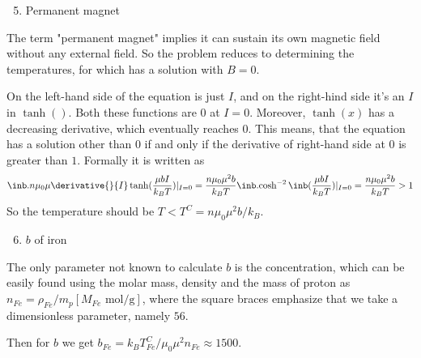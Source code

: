 \begin{enumerate}
\begin{enumerate}
    \setcounter{enumii}{4}
    \item Permanent magnet
\end{enumerate}

\hspace{.5cm}
The term "permanent magnet" implies
it can sustain its own magnetic field without any external field.
So the problem reduces to determining the temperatures,
for which  has a solution with $B = 0$.

\hspace{.5cm}
On the left-hand side of the equation is just $I$,
and on the right-hind side it's an $I$ in $\tanh()$.
Both these functions are $0$ at $I=0$.
Moreover, $\tanh(x)$ has a decreasing derivative,
which eventually reaches $0$.
This means, that the equation has a solution other than $0$
if and only if the derivative of right-hand side at $0$ is greater than $1$.
Formally it is written as
\begin{equation}
    \inb.{n \mu_0 \mu \derivative{}{I} \tanh(\frac{\mu bI}{k_B T})}|_{I=0} =
    \frac{n \mu_0 \mu^2 b}{k_B T} \inb.{\cosh^{-2} \inb({\frac{\mu bI}{k_B T}})}|_{I=0} =
    \frac{n \mu_0 \mu^2 b}{k_B T} > 1
\end{equation}
So the temperature should be $T < T^C = n \mu_0 \mu^2 b / k_B$.

\begin{enumerate}
    \setcounter{enumii}{5}
    \item $b$ of iron
\end{enumerate}

\hspace{.5cm}
The only parameter not known to calculate $b$ is the concentration,
which can be easily found using the molar mass, density and the mass of proton
as $n_{Fe} = \rho_{Fe} / m_p [M_{Fe} \text{ mol/g}]$,
where the square braces emphasize that we take a dimensionless parameter,
namely $56$.

\hspace{.5cm}
Then for $b$ we get $b_{Fe} = k_B T^C_{Fe} / \mu_0 \mu^2 n_{Fe} \approx 1500$.

\end{enumerate}
